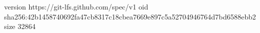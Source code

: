 version https://git-lfs.github.com/spec/v1
oid sha256:42b1458740692fa47cb8317c18cbea7669e897c5a52704946764d7bd6588ebb2
size 32864
